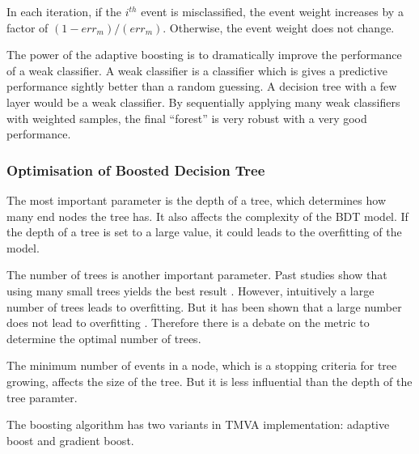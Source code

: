 In each iteration, if the $i^{th}$ event is misclassified, the event weight increases by a factor of $(1 - err_m)/(err_m)$. Otherwise, the event weight does not change.

The power of the adaptive boosting  is to dramatically improve the performance of a weak classifier. A weak classifier is a classifier which is gives a predictive performance sightly better than a random guessing. A decision tree with a few layer would be a weak classifier. By sequentially applying many weak classifiers with weighted samples, the final ``forest'' is very robust with a very good performance.



\subsubsection{Optimisation of Boosted Decision Tree}
\label{sec:pandoraMVAbdtVar}


The most important parameter is the depth of a tree, which determines how many end nodes the tree has. It also affects the complexity of the BDT model. If the depth of a tree is set to a large value, it could leads to the overfitting of the model.

The number of trees is another important parameter. Past studies show that using many small trees yields the best result \cite{hastie2009elements}. However, intuitively a large number of trees leads to overfitting. But it has been shown that a large number does not lead to overfitting \cite{hastie2009elements}. Therefore there is a debate on the metric to determine the optimal number of trees.

The minimum number of events in a node, which is a stopping criteria for tree growing, affects the size of the tree. But it is less influential than the depth of the tree paramter.

The boosting algorithm has two variants in TMVA implementation: adaptive boost and gradient boost.

